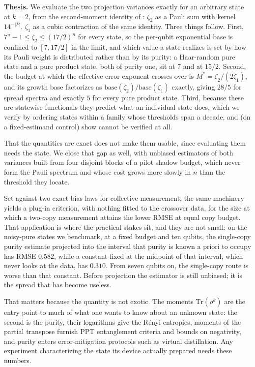 \documentclass[a4paper,superscriptaddress,nofootinbib,onecolumn,nopdfoutputerror]{quantumarticle}
\begin{document}
\textbf{Thesis.} We evaluate the two projection variances exactly for an arbitrary state at
\(k = 2\), from the second-moment identity of \cite{huang2020shadows}: \(\zeta_2\) as a Pauli sum
with kernel \(14^{-|P|}\), \(\zeta_1\) as a cubic contraction of the same identity. Three things
follow. First, \(7^n - 1 \le \zeta_2 \le (17/2)^n\) for every state, so the per-qubit exponential
base is confined to \([7, 17/2]\) in the limit, and which value a state realizes is set by how its
Pauli weight is distributed rather than by its purity: a Haar-random pure state and a pure product
state, both of purity one, sit at \(7\) and at \(15/2\). Second, the budget at which the effective
error exponent crosses over is \(M^* = \zeta_2/(2\zeta_1)\), and its growth base factorizes as
\(\mathrm{base}(\zeta_2)/\mathrm{base}(\zeta_1)\) exactly, giving \(28/5\) for spread spectra and
exactly \(5\) for every pure product state. Third, because these are statewise functionals they
predict what an individual state does, which we verify by ordering states within a family whose
thresholds span a decade, and (on a fixed-estimand control) show cannot be verified at all.

That the quantities are exact does not make them usable, since evaluating them needs the state.
We close that gap as well, with unbiased estimators of both variances built from four disjoint blocks
of a pilot shadow budget, which never form the Pauli spectrum and whose cost grows more slowly in
\(n\) than the threshold they locate.

Set against two exact bias laws for collective measurement, the same machinery yields a plug-in
criterion, with nothing fitted to the crossover data, for the size at which a two-copy measurement
attains the lower RMSE at equal copy budget. That application is where the practical stakes sit,
and they are not small: on the noisy-pure states we benchmark, at a fixed budget and ten qubits,
the single-copy purity estimate projected into the interval that purity is known a priori to occupy has
RMSE \(0.582\), while a constant fixed at the midpoint of that interval, which never looks at the
data, has \(0.310\). From seven qubits on, the single-copy route is worse than that constant.
Before projection the estimator is still unbiased; it is the spread that has become useless.

That matters because the quantity is not exotic. The moments \(\mathrm{Tr}(\rho^k)\) are the entry
point to much of what one wants to know about an unknown state: the second is the purity, their
logarithms give the R\'enyi entropies, moments of the partial transpose furnish PPT entanglement
criteria and bounds on negativity, and purity enters error-mitigation protocols such as virtual
distillation. Any experiment characterizing the state its device actually prepared needs these
numbers.
\end{document}
